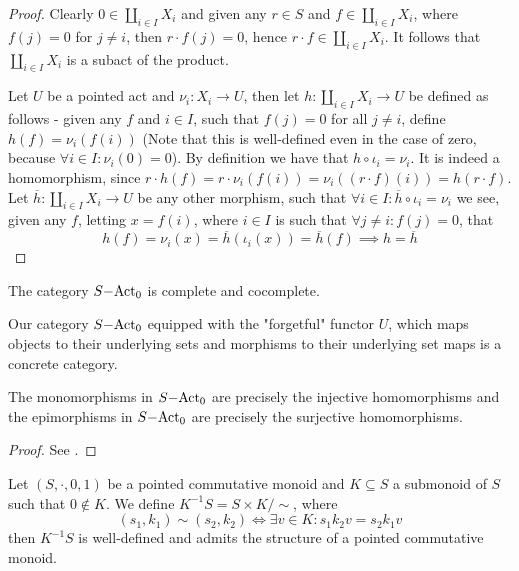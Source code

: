 \begin{proof}
    Clearly $0\in\coprod_{i\in I } X_i$ and given any $r\in S$ and $f\in\coprod_{i\in I } X_i$, where 
    $f(j)=0$ for $j\neq i$, then $r\cdot f(j)=0$, hence $r\cdot f \in\coprod_{i\in I} X_i$. It follows that 
    $\coprod_{i\in I} X_i$ is a subact of the product.\par 
    Let $U$ be a pointed act and $\nu_i : X_i \to U$, then let $h: \coprod_{i\in I} X_i \to U$ be defined as follows - 
    given any $f$ and $i\in I$, such that $f(j)=0$ for all $j\neq i$, define $h(f) = \nu_i(f(i))$ (Note that this is well-defined 
    even in the case of zero, because $\forall i\in I : \nu_i(0) = 0$). By definition we have that $h\circ \iota_i = \nu_i$. It is 
    indeed a homomorphism, since $r\cdot h(f) = r\cdot\nu_i(f(i))=\nu_i((r\cdot f)(i)) = h(r\cdot f)$. Let 
    $\overline{h} : \coprod_{i\in I } X_i \to U$ be any other morphism, such that $\forall i\in I :\overline{h}\circ\iota_i = \nu_i$ we see, given 
    any $f$, letting $x=f(i)$, where $i\in I$ is such that $\forall j\neq i : f(j)=0$, that 
    \[
        h(f) = \nu_i(x) = \overline{h}(\iota_i(x)) = \overline{h}(f) \implies h=\overline{h} 
    \]
\end{proof}
\begin{corollary}
    The category $S\mathrm{-Act}_0$ is complete and cocomplete.
\end{corollary}
    Our category $S\mathrm{-Act}_0$ equipped with the "forgetful" functor $U$, which maps objects to their underlying sets and morphisms 
    to their underlying set maps is a concrete category.
\begin{proposition}
    The monomorphisms in $S\mathrm{-Act}_0$ are precisely the injective homomorphisms and the epimorphisms in $S\mathrm{-Act}_0$ are precisely
    the surjective homomorphisms.
\end{proposition}
\begin{proof}
    See \cite[Proposition~6.15]{Kilp00}.
\end{proof}
\begin{proposition}
    Let $(S,\cdot,0,1)$ be a pointed commutative monoid and 
    $K\subseteq S$ a submonoid of $S$ such that $0\not\in K$. 
    We define $K^{-1}S = S\times K/\sim$, where 
    \[
        (s_1,k_1)\sim(s_2,k_2)\iff \exists v\in K : s_1k_2v = s_2k_1v 
    \]
    then $K^{-1}S$ is well-defined and admits the structure of a pointed commutative monoid.
\end{proposition}

